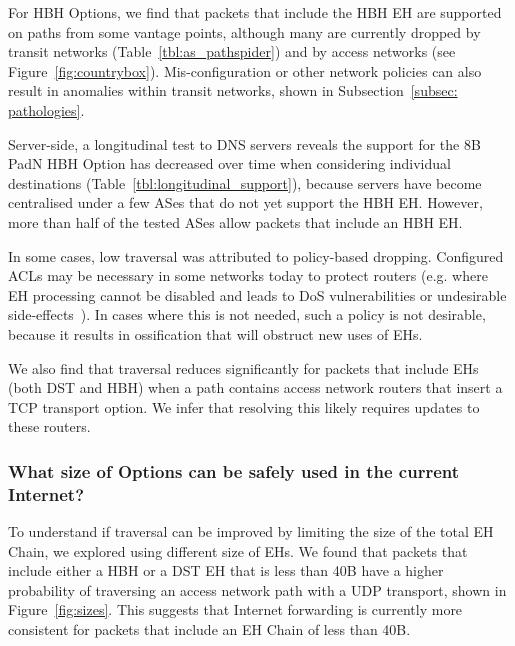 \documentclass[conference]{IEEEtran}
\begin{document}
For HBH Options, we find that packets that include the HBH EH are supported on paths from some vantage points, although many are currently dropped by transit networks (Table~\ref{tbl:as_pathspider}) and by access networks (see Figure~\ref{fig:countrybox}). Mis-configuration or other network policies can also result in anomalies within transit networks, shown in Subsection~\ref{subsec: pathologies}. 

Server-side, a longitudinal test to DNS servers reveals the support for the 8B PadN HBH Option has decreased over time when considering individual destinations (Table~\ref{tbl:longitudinal_support}), because servers have become centralised under a few ASes that do not yet support the HBH EH.  However, more than half of the tested ASes allow packets that include an HBH EH. 

In some cases, low traversal was attributed to policy-based dropping. Configured ACLs may be necessary in some networks today to protect routers (e.g. where EH processing cannot be disabled and leads to DoS vulnerabilities or undesirable side-effects~\cite{passive-threats}). In cases where this is not needed, such a policy is not desirable, because it results in ossification that will obstruct new uses of EHs.

We also find that traversal reduces significantly for packets that include EHs (both DST and HBH) when a path contains access network routers that insert a TCP transport option. We infer that resolving this likely requires updates to these routers.





\subsubsection{What size of Options can be safely used in the current Internet?}

To understand if traversal can be improved by limiting the size of the total EH Chain, we explored using different size of EHs. We found that packets that include either a HBH or a DST EH that is less than 40B have a higher probability of traversing an access network path with a UDP transport, shown in Figure~\ref{fig:sizes}.
This suggests that Internet forwarding is currently more consistent for packets that include an EH Chain of less than 40B.
\end{document}
